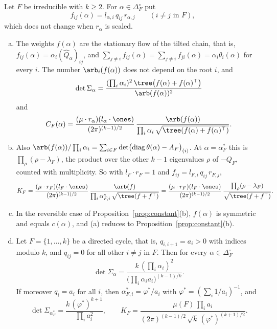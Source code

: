 \begin{proposition}\label{prop:forest}
Let $F$ be irreducible with $k\ge2$. For $\alpha\in\Delta_F^\circ$ put
\[
f_{ij}(\alpha)=l_{\alpha,i}\,q_{ij}\,r_{\alpha,j}\qquad(i\ne j\text{ in }F),
\]
which does not change when $r_\alpha$ is scaled.
\begin{enumerate}[(a)]
\item The weights $f(\alpha)$ are the stationary flow of the tilted chain, that is,
$f_{ij}(\alpha)=\alpha_i(\widehat Q_\alpha)_{ij}$, and
$\sum_{j\ne i}f_{ij}(\alpha)=\sum_{j\ne i}f_{ji}(\alpha)=\alpha_i\theta_i(\alpha)$ for every $i$.
The number $\arb_i(f(\alpha))$ does not depend on the root $i$, and
\[
\det\Sigma_\alpha=\frac{(\prod_i\alpha_i)^2\,\tree\bigl(f(\alpha)+f(\alpha)^\top\bigr)}
{\arb(f(\alpha))^2}
\]
and
\[
C_F(\alpha)=\frac{(\mu\cdot r_\alpha)(l_\alpha\cdot\ones)}{(2\pi)^{(k-1)/2}}\,
\frac{\arb(f(\alpha))}{\prod_i\alpha_i\,\sqrt{\tree(f(\alpha)+f(\alpha)^\top)}} .
\]
\item Also $\arb(f(\alpha))/\prod_i\alpha_i
=\sum_{i\in F}\det\bigl(\operatorname{diag}\theta(\alpha)-A_F\bigr)_{(i)}$. At
$\alpha=\alpha^*_F$ this is $\prod_\rho(\rho-\lambda_F)$, the product over the other $k-1$
eigenvalues $\rho$ of $-Q_F$, counted with multiplicity. So with $l_F\cdot r_F=1$ and
$f_{ij}=l_{F,i}\,q_{ij}\,r_{F,j}$,
\[
K_F=\frac{(\mu\cdot r_F)(l_F\cdot\ones)}{(2\pi)^{(k-1)/2}}\,
\frac{\arb(f)}{\prod_i\alpha^*_{F,i}\,\sqrt{\tree(f+f^\top)}}
=\frac{(\mu\cdot r_F)(l_F\cdot\ones)}{(2\pi)^{(k-1)/2}}\,
\frac{\prod_\rho(\rho-\lambda_F)}{\sqrt{\tree(f+f^\top)}} .
\]
\item In the reversible case of Proposition~\ref{prop:constant}(b), $f(\alpha)$ is symmetric
and equals $c(\alpha)$, and \textup{(a)} reduces to Proposition~\ref{prop:constant}(b).
\item Let $F=\{1,\dots,k\}$ be a directed cycle, that is, $q_{i,i+1}=a_i>0$ with indices modulo
$k$, and $q_{ij}=0$ for all other $i\ne j$ in $F$. Then for every $\alpha\in\Delta_F^\circ$
\[
\det\Sigma_\alpha=\frac{k\,(\prod_i\alpha_i)^2}{\bigl(\prod_i\alpha_ia_i\bigr)^{(k-1)/k}} .
\]
If moreover $q_i=a_i$ for all $i$, then $\alpha^*_{F,i}=\varphi^*/a_i$ with
$\varphi^*=(\sum_i1/a_i)^{-1}$, and
\[
\det\Sigma_{\alpha^*_F}=\frac{k\,(\varphi^*)^{k+1}}{\prod_ia_i^2},\qquad
K_F=\frac{\mu(F)\,\prod_ia_i}{(2\pi)^{(k-1)/2}\,\sqrt k\,(\varphi^*)^{(k+1)/2}} .
\]
\end{enumerate}
\end{proposition}

